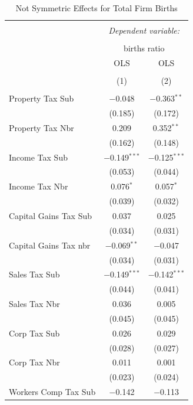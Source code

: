 \documentclass[12pt,a4paper]{article}
\begin{document}
\begin{table}[!htbp] \centering 
  \caption{Not Symmetric Effects for  Total Firm Births} 
  \label{--noequality} 
\footnotesize 
\begin{tabular}{@{\extracolsep{5pt}}lcc} 
\\[-1.8ex]\hline 
\hline \\[-1.8ex] 
 & \multicolumn{2}{c}{\textit{Dependent variable:}} \\ 
\cline{2-3} 
\\[-1.8ex] & \multicolumn{2}{c}{births ratio} \\ 
 & OLS & OLS \\ 
\\[-1.8ex] & (1) & (2)\\ 
\hline \\[-1.8ex] 
 Property Tax Sub & $-$0.048 & $-$0.363$^{**}$ \\ 
  & (0.185) & (0.172) \\ 
  Property Tax Nbr & 0.209 & 0.352$^{**}$ \\ 
  & (0.162) & (0.148) \\ 
  Income Tax Sub & $-$0.149$^{***}$ & $-$0.125$^{***}$ \\ 
  & (0.053) & (0.044) \\ 
  Income Tax Nbr & 0.076$^{*}$ & 0.057$^{*}$ \\ 
  & (0.039) & (0.032) \\ 
  Capital Gains Tax Sub & 0.037 & 0.025 \\ 
  & (0.034) & (0.031) \\ 
  Capital Gains Tax nbr & $-$0.069$^{**}$ & $-$0.047 \\ 
  & (0.034) & (0.031) \\ 
  Sales Tax Sub & $-$0.149$^{***}$ & $-$0.142$^{***}$ \\ 
  & (0.044) & (0.041) \\ 
  Sales Tax Nbr & 0.036 & 0.005 \\ 
  & (0.045) & (0.045) \\ 
  Corp Tax Sub & 0.026 & 0.029 \\ 
  & (0.028) & (0.027) \\ 
  Corp Tax Nbr & 0.011 & 0.001 \\ 
  & (0.023) & (0.024) \\ 
  Workers Comp Tax Sub & $-$0.142 & $-$0.113 \\ 

\end{tabular}
\end{table}
\end{document}
